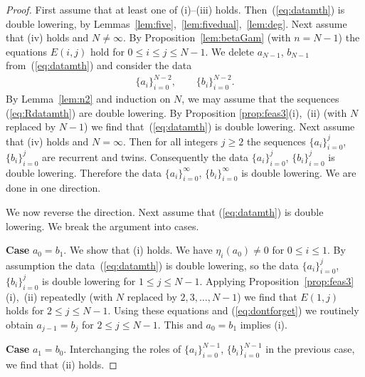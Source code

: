 \documentclass[pdftex]{sigma}
\numberwithin{equation}{section}
\begin{document}
\begin{proof} First assume that at least one of (i)--(iii) holds.
Then~(\ref{eq:datamth}) is double lowering, by Lemmas~\ref{lem:five},~\ref{lem:fivedual},~\ref{lem:deg}.
Next assume that (iv) holds
and $N\not=\infty$.
By Proposition~\ref{lem:betaGam} (with $n=N-1$) the equations
$E(i,j)$ hold for $0 \leq i \leq j\leq N-1$.
We delete $a_{N-1}$, $b_{N-1}$ from~(\ref{eq:datamth}) and consider the data
\begin{gather}
\lbrace a_i \rbrace_{i=0}^{N-2}, \qquad
\lbrace b_i \rbrace_{i=0}^{N-2}. \label{eq:Rdatamth}
\end{gather}
By Lemma~\ref{lem:n2} and
induction on $N$, we may assume that
the sequences (\ref{eq:Rdatamth}) are double lowering.
By Proposition \ref{prop:feas3}(i),~(ii) (with $N$ replaced by
$N-1$) we find that~(\ref{eq:datamth}) is double lowering.
Next assume that
(iv) holds and $N=\infty$. Then for all integers $j\geq 2$
the sequences
$\lbrace a_i \rbrace_{i=0}^j$,
$\lbrace b_i \rbrace_{i=0}^j$ are recurrent and twins.
Consequently the data
$\lbrace a_i \rbrace_{i=0}^j$,
$\lbrace b_i \rbrace_{i=0}^j$ is double lowering.
Therefore the data
$\lbrace a_i \rbrace_{i=0}^\infty$,
$\lbrace b_i \rbrace_{i=0}^\infty$ is double lowering.
We are done in one direction.

We now reverse the direction.
Next assume that
(\ref{eq:datamth}) is double lowering. We break the argument into
cases.

{\bf Case} $a_0 = b_1$.
We show that (i) holds.
We have $\eta_i(a_0)\not=0$ for $0 \leq i \leq 1$.
By assumption the data~(\ref{eq:datamth}) is double lowering,
so the data
$\lbrace a_i \rbrace_{i=0}^j$,
$\lbrace b_i \rbrace_{i=0}^j$ is double lowering for
$1 \leq j\leq N-1$. Applying Proposition~\ref{prop:feas3}(i),~(ii) repeatedly
(with $N$ replaced by $2,3,\ldots, N-1$) we find that
$E(1,j)$ holds for
$2\leq j\leq N-1$. Using these equations
and (\ref{eq:dontforget})
we routinely obtain $a_{j-1} = b_j$ for $2 \leq j \leq N-1$.
This and $a_0=b_1$ implies (i).

{\bf Case} $a_1 = b_0$. Interchanging the roles of
$\lbrace a_i \rbrace_{i=0}^{N-1}$,
$\lbrace b_i \rbrace_{i=0}^{N-1}$ in the previous case, we find
that (ii) holds.


\end{proof}
\end{document}
